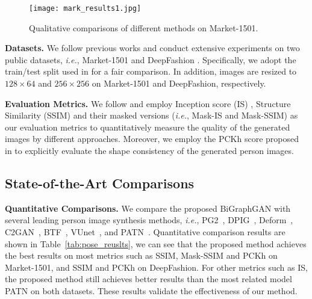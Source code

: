 \documentclass{bmvc2k}
\begin{document}
\begin{figure}[!t]
	\centering
	\texttt{[image: mark\_results1.jpg]}
	\caption{Qualitative comparisons of different methods on Market-1501.}
	\label{fig:mark_results}
\end{figure}

\noindent \textbf{Datasets.} 
We follow previous works \cite{ma2017pose,siarohin2018deformable,zhu2019progressive} and conduct extensive experiments on two public datasets, \emph{i.e.}, Market-1501 \cite{zheng2015scalable} and DeepFashion \cite{liu2016deepfashion}.
Specifically, we adopt the train/test split used in \cite{zhu2019progressive,tang2020xinggan} for a fair comparison.
In addition, images are resized to $128 {\times} 64$ and $256 {\times} 256$ on Market-1501 and DeepFashion, respectively.
 
\noindent \textbf{Evaluation Metrics.}
We follow \cite{ma2017pose,siarohin2018deformable,zhu2019progressive} and employ Inception score (IS) \cite{salimans2016improved}, Structure Similarity (SSIM) \cite{wang2004image} and their masked versions (\emph{i.e.}, Mask-IS and Mask-SSIM) as our evaluation metrics to quantitatively measure the quality of the generated images by different approaches.
Moreover, we employ the PCKh score proposed in \cite{zhu2019progressive} to explicitly evaluate the shape consistency of the generated person images.







\subsection{State-of-the-Art Comparisons}

\noindent \textbf{Quantitative Comparisons.}
We compare the proposed BiGraphGAN with several leading person image synthesis methods, \emph{i.e.}, PG2~\cite{ma2017pose}, DPIG~\cite{ma2018disentangled}, Deform~\cite{siarohin2018deformable,siarohin2019appearance}, C2GAN~\cite{tang2019cycle}, BTF~\cite{albahar2019guided}, VUnet~\cite{esser2018variational}, and PATN~\cite{zhu2019progressive}.
Quantitative comparison results are shown in Table~\ref{tab:pose_reuslts}, we can see that the proposed method achieves the best results on most metrics such as SSIM, Mask-SSIM and PCKh on Market-1501, and SSIM and PCKh on DeepFashion.
For other metrics such as IS, the proposed method still achieves better results than the most related model PATN on both datasets.
These results validate the effectiveness of our method.
\end{document}
